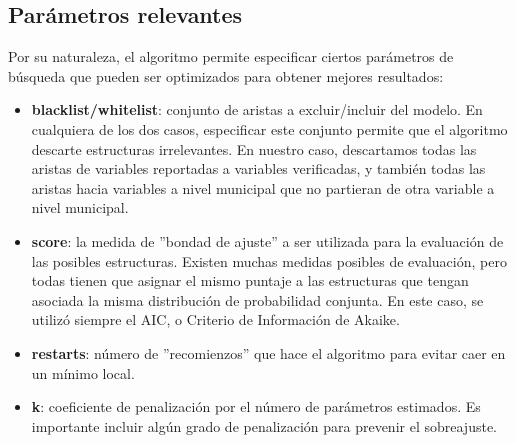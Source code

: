 \subsection*{Parámetros relevantes}
Por su naturaleza, el algoritmo permite especificar ciertos parámetros de búsqueda que pueden ser optimizados para obtener mejores resultados:
\begin{itemize}
    \item \textbf{blacklist/whitelist}: conjunto de aristas a excluir/incluir del modelo. En cualquiera de los dos casos, especificar este conjunto permite que el algoritmo descarte estructuras irrelevantes. En nuestro caso, descartamos todas las aristas de variables reportadas a variables verificadas, y también todas las aristas hacia variables a nivel municipal que no partieran de otra variable a nivel municipal.
    \item \textbf{score}: la medida de ''bondad de ajuste'' a ser utilizada para la evaluación de las posibles estructuras. Existen muchas medidas posibles de evaluación, pero todas tienen que asignar el mismo puntaje a las estructuras que tengan asociada la misma distribución de probabilidad conjunta. En este caso, se utilizó siempre el AIC, o Criterio de Información de Akaike.
    \item \textbf{restarts}: número de ''recomienzos'' que hace el algoritmo para evitar caer en un mínimo local.
    \item \textbf{k}: coeficiente de penalización por el número de parámetros estimados. Es importante incluir algún grado de penalización para prevenir el sobreajuste.
\end{itemize}
